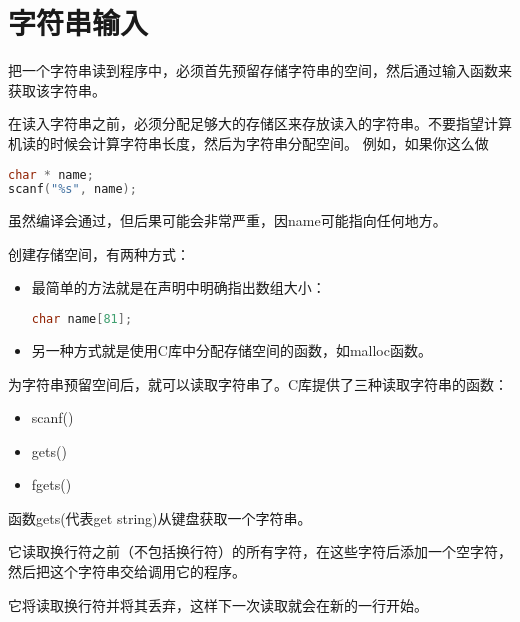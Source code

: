 \section{字符串输入}

\begin{frame}[fragile]\ft{\secname} 
把一个字符串读到程序中，必须首先预留存储字符串的空间，然后通过输入函数来获取该字符串。
\end{frame}

\begin{frame}[fragile] 
在读入字符串之前，必须分配足够大的存储区来存放读入的字符串。\textcolor{acolor1}{不要指望计算机读的时候会计算字符串长度，然后为字符串分配空间。} 例如，如果你这么做
\begin{lstlisting}[language=c,showstringspaces=true]
char * name;
scanf("%s", name);
\end{lstlisting}
虽然编译会通过，但后果可能会非常严重，因{\tf name}可能指向任何地方。
\end{frame}

\begin{frame}[fragile] 
创建存储空间，有两种方式：
\begin{itemize}
\item 
最简单的方法就是在声明中明确指出数组大小：
\begin{lstlisting}[language=c,showstringspaces=true]
char name[81];
\end{lstlisting}
\vspace{0.05in}
\item 
另一种方式就是使用C库中分配存储空间的函数，如malloc函数。
\end{itemize}
\end{frame}

\begin{frame}[fragile] 
为字符串预留空间后，就可以读取字符串了。C库提供了三种读取字符串的函数：
\begin{itemize}
\item {\tf scanf()}
\item {\tf gets()}
\item {\tf fgets()}
\end{itemize}
\end{frame}

\begin{frame}[fragile] 
函数gets(代表get string)从键盘获取一个字符串。\vspace{0.2in}

\textcolor{acolor1}{它读取换行符之前（不包括换行符）的所有字符，在这些字符后添加一个空字符，然后把这个字符串交给调用它的程序。}

\vspace{0.2in}
它将读取换行符并将其丢弃，这样下一次读取就会在新的一行开始。
\end{frame}

